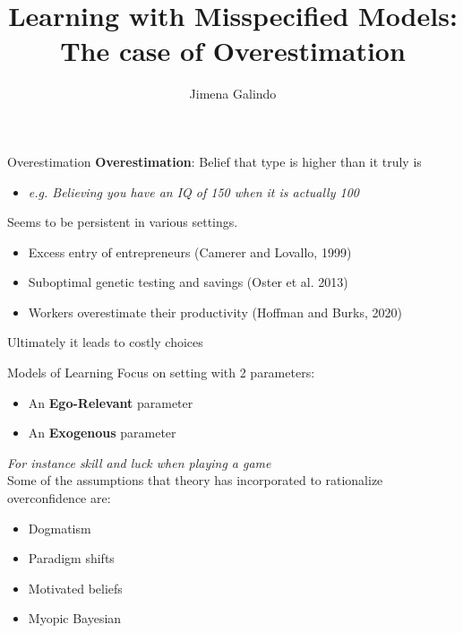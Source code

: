 \documentclass[aspectratio=169]{beamer}
\title{Learning with Misspecified Models:\\  
The case of Overestimation}
\author{Jimena Galindo}
\begin{document}
\frame{\titlepage}

\begin{frame}{Overestimation}
    \textbf{Overestimation}: Belief that type is higher than it truly is\\
    \begin{itemize}
        \item \textit{e.g. Believing you have an IQ of 150 when it is actually 100}
    \end{itemize}
    \bigskip
    \pause
    Seems to be persistent in various settings. 
    \begin{itemize} 
        \item Excess entry of entrepreneurs (Camerer and Lovallo, 1999)
        \item Suboptimal genetic testing and savings (Oster et al. 2013)
        \item  Workers overestimate their productivity (Hoffman and Burks, 2020)
    \end{itemize}
    \bigskip
    \alert{Ultimately it leads to costly choices}
    
\end{frame}

\begin{frame}{Models of Learning}
    Focus on setting with 2 parameters:
    \begin{itemize}
        \item An \alert{\textbf{Ego-Relevant}} parameter
        \item An \alert{\textbf{Exogenous}} parameter
    \end{itemize}
    \textit{For instance skill and luck when playing a game}\\
    \bigskip
    \pause
    Some of the assumptions that theory has incorporated to rationalize overconfidence are:
    \begin{itemize}
        \item Dogmatism
        \item Paradigm shifts
        \item Motivated beliefs
        \item Myopic Bayesian
    \end{itemize}
\end{frame}
\end{document}
